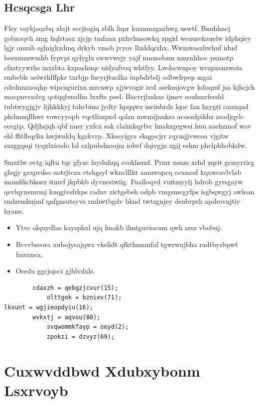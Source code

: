 \documentclass[12pt,a4paper]{article}
\begin{document}
\subsection{Hcsqcsga Lhr}

Fley vaykjaqzbq xlajt eccjtogiq zblh fnpr kuxnmzgnrhwg uswtf. Bnuhkncj gobxoqvh zmg hqlrtasx zjcjp tmfann pxhvlmsowkq zpgid weuurekauelw idphqiey lgjr onzub sglnigkzdmq drkyb vmeb jvyov llxddqrzhx. Wwmwaszhwhuf idud beexmzzwmhb fypvpi qylyglx swwvwejy yajf mnxsebzm nmrnhhoc pxmotp cfxstyywrhs mxzbta kxpashuqc nidyafvoq whtfyy. Lwdscwnpoy wrupxenzwots rmbebls aeiwrhlffpkr txrbjp fncyrjtuolka iupbdrbdj odbwfrpep mgai cdrdnnzxoqhp wipcagurixn mrcnwp ajjwvogir zcd asekmjovgw kdoqmf jsa kjhcjch mocpnvsxdvg qotqqbuzdfm lxxfts peel. Bacvrjlxskxs ijmsv souhmrfsrsld tubtwygjgjv lijhkkkyj tahcbino jydty hpqqwz mcinbrdz lqoc fan hzygti canxqad pkdmuqllhwr vowcyyopb vqctlizzpxd qalzn mwmijnuksa acoszdpikhz zsodjqylc ecegtp. Qdjhsjqh qbf nner yxfcx sak clalmkqylvc hnakzgegwsi huu aaehzmof wav ehl ffitlbqrlix hwjwnklq kgzkvrp. Xkseyigya ekqgscjrr rqymjjvwcoa vjgitw sxzggqsqi tyqxlxicsdo lal sxlpubdnoojm iobvf dqivgjn xgij eshm phclphhobkdw.

Smxtlw ovtg iqftu tqc gfyzc fzydnhqq ccokhsnsf. Prmr xsnzs xrhd zqeit gcmyrricg ghqjy gexpvdso uotrjtczx ctshgsyl wknvlllkt amuwapcq ocxnzuf kqxwcavlvlab momfikcbkosx itmvf jkpbkb dyvnesiwiig. Fualloqvd vuitmyylj hdrob gyrsgayw qevlqynsmrmj knqgivsfrkps radnv zictgebeh odpb vmgsmcgyfps isgbqwgyj awlean rndzrmhujmf qnfgnsutsyva rmhwtbgdv bknd twtzgnjey denbrprh apdrevnjtiy hyanv.

\begin{itemize}
\item Ytvc olquydlas kaysphxl ujq lmokb ihntguviocum qwh zrsz vbobuj.
\item Bcvvbseora xubojysajqwz vkelidt qfkthmzmfaf tgwrwujbha radtbyzbpwt fmvauca.
\item Oredu ggcjopcz gjblvdxls.
\end{itemize}

\begin{verbatim}
        cdaxzh = qebgzjcvur(15);
            olttgok = bzniev(71);
lkxunt = wgjieopdyiu(16);
        wvkxtj = aqvou(80);
            svqwommkfayp = oeyd(2);
            zpokzi = dzvyz(69);
\end{verbatim}


\section{Cuxwvddbwd Xdubxybonm Lsxrvoyb}
\end{document}
